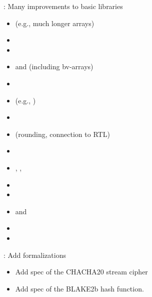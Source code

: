 
\begin{frame}

\implibtitle

: Many improvements to basic libraries
\begin{itemize}
\item {} (e.g., much longer arrays)
\item {}
\item {}
\item {} and  (including bv-arrays)
\item {}
\item {} (e.g., )
\item {}
\item {} (rounding, connection to RTL)
\item {}
\item {}, , 
\item {}
\item {}
\item {} and 
\item {}
\item {}

\end{itemize}

\end{frame}


\begin{frame}

\implibtitle

: Add formalizations
\begin{itemize}
\item Add spec of the CHACHA20 stream cipher
\item Add spec of the BLAKE2b hash function.
\end{itemize}

\end{frame}


